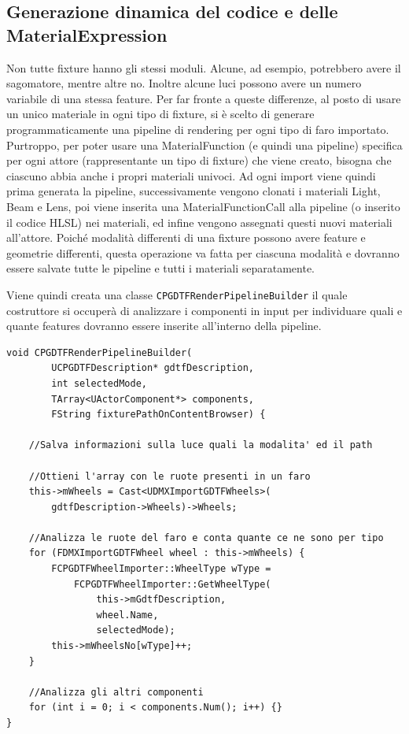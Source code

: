 \documentclass[main.tex]{subfiles}
\begin{document}
\lstset{language=UEcpp}
\subsection{Generazione dinamica del codice e delle MaterialExpression}\label{subsec:2_codeGeneration}
Non tutte fixture hanno gli stessi moduli. Alcune, ad esempio, potrebbero avere il sagomatore, mentre altre no. Inoltre alcune luci possono avere un numero variabile di una stessa feature. Per far fronte a queste differenze, al posto di usare un unico materiale in ogni tipo di fixture, si è scelto di generare programmaticamente una pipeline di rendering per ogni tipo di faro importato. Purtroppo, per poter usare una MaterialFunction (e quindi una pipeline) specifica per ogni attore (rappresentante un tipo di fixture) che viene creato, bisogna che ciascuno abbia anche i propri materiali univoci. Ad ogni import viene quindi prima generata la pipeline, successivamente vengono clonati i materiali Light, Beam e Lens, poi viene inserita una MaterialFunctionCall alla pipeline (o inserito il codice HLSL) nei materiali, ed infine vengono assegnati questi nuovi materiali all'attore. \newline
Poiché modalità differenti di una fixture possono avere feature e geometrie differenti, questa operazione va fatta per ciascuna modalità e dovranno essere salvate tutte le pipeline e tutti i materiali separatamente. \newline

Viene quindi creata una classe \lstinline{CPGDTFRenderPipelineBuilder} il quale costruttore si occuperà di analizzare i componenti in input per individuare quali e quante features dovranno essere inserite all'interno della pipeline.
\begin{lstlisting}
void CPGDTFRenderPipelineBuilder(
        UCPGDTFDescription* gdtfDescription,
        int selectedMode,
        TArray<UActorComponent*> components,
        FString fixturePathOnContentBrowser) {

    //Salva informazioni sulla luce quali la modalita' ed il path

	//Ottieni l'array con le ruote presenti in un faro
    this->mWheels = Cast<UDMXImportGDTFWheels>(
        gdtfDescription->Wheels)->Wheels;

    //Analizza le ruote del faro e conta quante ce ne sono per tipo
	for (FDMXImportGDTFWheel wheel : this->mWheels) {
		FCPGDTFWheelImporter::WheelType wType =
            FCPGDTFWheelImporter::GetWheelType(
                this->mGdtfDescription,
                wheel.Name,
                selectedMode);
		this->mWheelsNo[wType]++;
	}

    //Analizza gli altri componenti
	for (int i = 0; i < components.Num(); i++) {}
}
\end{lstlisting}
\end{document}
